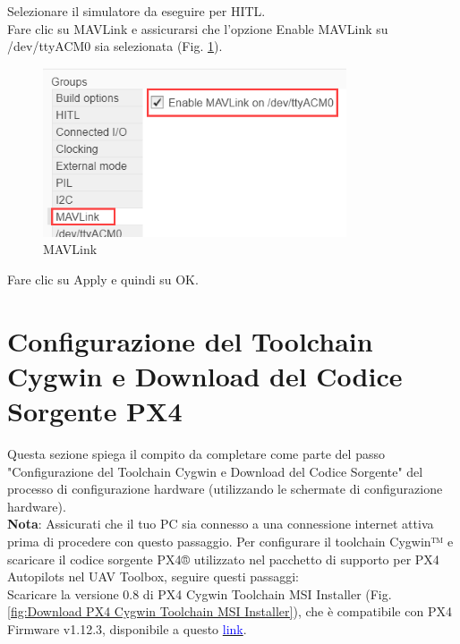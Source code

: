 \noindent
Selezionare il simulatore da eseguire per HITL.
\\
Fare clic su MAVLink e assicurarsi che l'opzione Enable MAVLink su /dev/ttyACM0 sia selezionata (Fig. \ref{fig:MAVLink}).
\begin{figure}[H] %
  \centering
  \includegraphics[width=0.8\textwidth]{files/images/MAVLink.png} %
  \caption{MAVLink} %
  \label{fig:MAVLink} %
\end{figure}
\noindent
Fare clic su Apply e quindi su OK.


\section{Configurazione del Toolchain Cygwin e Download del Codice Sorgente PX4}
Questa sezione spiega il compito da completare come parte del passo "Configurazione del Toolchain Cygwin e Download del Codice Sorgente" del processo di configurazione hardware (utilizzando le schermate di configurazione hardware). 
\\
\textbf{Nota}: Assicurati che il tuo PC sia connesso a una connessione internet attiva prima di procedere con questo passaggio.
Per configurare il toolchain Cygwin™ e scaricare il codice sorgente PX4® utilizzato nel pacchetto di supporto per PX4 Autopilots nel UAV Toolbox, seguire questi passaggi:
\\
Scaricare la versione 0.8 di PX4 Cygwin Toolchain MSI Installer (Fig. \ref{fig:Download PX4 Cygwin Toolchain MSI Installer}), che è compatibile con PX4 Firmware v1.12.3, disponibile a questo \href{https://github.com/PX4/PX4-windows-toolchain/releases/tag/v0.8}{\textcolor{blue}{link}}.

